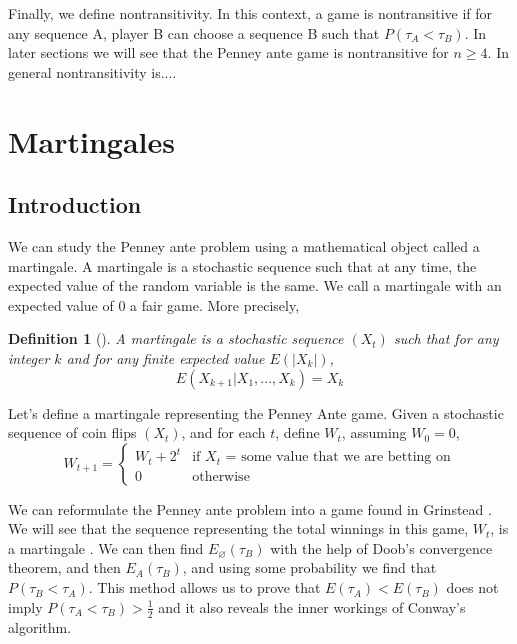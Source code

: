 \documentclass{article}
\newtheorem{definition}[theorem]{Definition}
\numberwithin{mytheorem}{subsection} %
\begin{document}
		Finally, we define nontransitivity. In this context, a game is nontransitive if for any sequence A, player B can choose a sequence B such that $P(\tau_A < \tau_B)$. In later sections we will see that the Penney ante game is nontransitive for $n \geq 4$. In general nontransitivity is....




	\section{Martingales}
		\subsection{Introduction}
			We can study the Penney ante problem using a mathematical object called a martingale. A martingale is a stochastic sequence such that at any time, the expected value of the random variable is the same. We call a martingale with an expected value of 0 a fair game. More precisely,

			\begin{definition}[\cite{li}]
				A {\em martingale} is a stochastic sequence $(X_t)$ such that for any
				integer $k$ and for any finite expected value $E(|X_k|)$, $$E(X_{k+1} | X_1, ..., X_k) = X_k$$		
			\end{definition}

		    Let's define a martingale representing the Penney Ante game. Given a stochastic sequence of coin flips $(X_t)$, and for each $t$, define $W_t$, assuming $W_0=0$,
		    \[ W_{t+1}=\begin{cases} 
		      W_{t} + 2^t & \text{if $X_t$ = some value that we are betting on}\\
		      0 & \text{otherwise} 
			  \end{cases} \]

		    We can reformulate the Penney ante problem into a game found in Grinstead \cite{grinstead}. We will see that the sequence representing the total winnings in this game, $W_t$, is a martingale \cite{grinstead}. We can then find $E_{\varnothing}(\tau_{B})$ with the help of Doob's convergence theorem, and then $E_A(\tau_{B})$, and using some probability we find that $P(\tau_{B} < \tau_{A})$. This method allows us to prove that $E(\tau_A) < E(\tau_B)$ does not imply $P(\tau_A < \tau_B) > \frac{1}{2}$ and it also reveals the inner workings of Conway's algorithm. 
\end{document}
